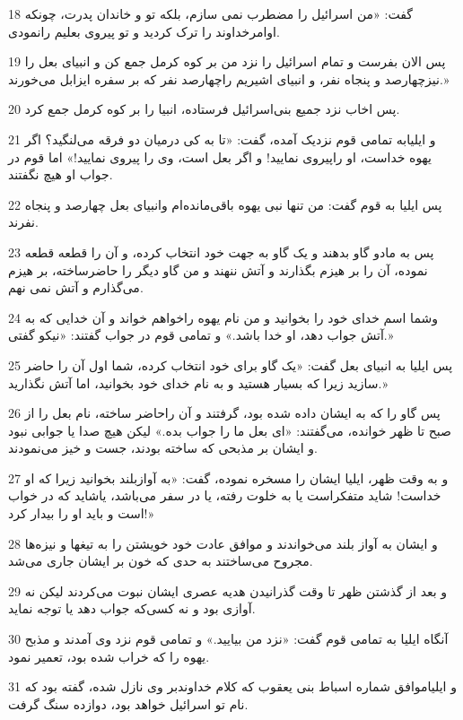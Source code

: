 \par 18 گفت: «من اسرائیل را مضطرب نمی سازم، بلکه تو و خاندان پدرت، چونکه اوامرخداوند را ترک کردید و تو پیروی بعلیم رانمودی.
\par 19 پس الان بفرست و تمام اسرائیل را نزد من بر کوه کرمل جمع کن و انبیای بعل را نیزچهارصد و پنجاه نفر، و انبیای اشیریم راچهارصد نفر که بر سفره ایزابل می‌خورند.»
\par 20 پس اخاب نزد جمیع بنی‌اسرائیل فرستاده، انبیا را بر کوه کرمل جمع کرد.
\par 21 و ایلیابه تمامی قوم نزدیک آمده، گفت: «تا به کی درمیان دو فرقه می‌لنگید؟ اگر یهوه خداست، او راپیروی نمایید! و اگر بعل است، وی را پیروی نمایید!» اما قوم در جواب او هیچ نگفتند.
\par 22 پس ایلیا به قوم گفت: من تنها نبی یهوه باقی‌مانده‌ام وانبیای بعل چهارصد و پنجاه نفرند.
\par 23 پس به مادو گاو بدهند و یک گاو به جهت خود انتخاب کرده، و آن را قطعه قطعه نموده، آن را بر هیزم بگذارند و آتش ننهند و من گاو دیگر را حاضرساخته، بر هیزم می‌گذارم و آتش نمی نهم.
\par 24 وشما اسم خدای خود را بخوانید و من نام یهوه راخواهم خواند و آن خدایی که به آتش جواب دهد، او خدا باشد.» و تمامی قوم در جواب گفتند: «نیکو گفتی.»
\par 25 پس ایلیا به انبیای بعل گفت: «یک گاو برای خود انتخاب کرده، شما اول آن را حاضر سازید زیرا که بسیار هستید و به نام خدای خود بخوانید، اما آتش نگذارید.»
\par 26 پس گاو را که به ایشان داده شده بود، گرفتند و آن راحاضر ساخته، نام بعل را از صبح تا ظهر خوانده، می‌گفتند: «ای بعل ما را جواب بده.» لیکن هیچ صدا یا جوابی نبود و ایشان بر مذبحی که ساخته بودند، جست و خیز می‌نمودند.
\par 27 و به وقت ظهر، ایلیا ایشان را مسخره نموده، گفت: «به آوازبلند بخوانید زیرا که او خداست! شاید متفکراست یا به خلوت رفته، یا در سفر می‌باشد، یاشاید که در خواب است و باید او را بیدار کرد!»
\par 28 و ایشان به آواز بلند می‌خواندند و موافق عادت خود خویشتن را به تیغها و نیزه‌ها مجروح می‌ساختند به حدی که خون بر ایشان جاری می‌شد.
\par 29 و بعد از گذشتن ظهر تا وقت گذرانیدن هدیه عصری ایشان نبوت می‌کردند لیکن نه آوازی بود و نه کسی‌که جواب دهد یا توجه نماید.
\par 30 آنگاه ایلیا به تمامی قوم گفت: «نزد من بیایید.» و تمامی قوم نزد وی آمدند و مذبح یهوه را که خراب شده بود، تعمیر نمود.
\par 31 و ایلیاموافق شماره اسباط بنی یعقوب که کلام خداوندبر وی نازل شده، گفته بود که نام تو اسرائیل خواهد بود، دوازده سنگ گرفت.
